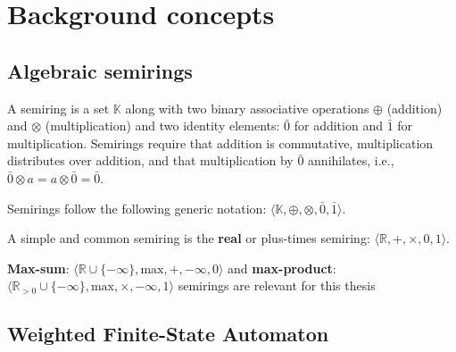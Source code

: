 \chapter{Background concepts}

\label{background}

\section{Algebraic semirings}

\begin{definition}
  A semiring is a set $\mathbb{K}$ along with two binary associative operations $\oplus$ (addition) and $\otimes$ (multiplication) and two identity elements: $\bar{0}$ for addition and $\bar{1}$ for multiplication. Semirings require that addition is commutative, multiplication distributes over addition, and that multiplication by $\bar{0}$ annihilates, i.e., $\bar{0} \otimes a = a \otimes \bar{0} = \bar{0}$. \\
\end{definition}

\vspace{-10pt}

\begin{remark}
  Semirings follow the following generic notation: $\langle \mathbb{K}, \oplus, \otimes, \bar{0}, \bar{1} \rangle$.
\end{remark}

\begin{remark}
  A simple and common semiring is the \textbf{real} or plus-times semiring: $\langle \mathbb{R}, +, \times, 0, 1 \rangle$.
\end{remark}

\begin{remark}
  \textbf{Max-sum}: $\langle \mathbb{R} \cup \{-\infty\}, \text{max}, +, -\infty, 0 \rangle$ and \textbf{max-product}: $\langle \mathbb{R}_{>0} \cup \{-\infty\}, \text{max}, \times, -\infty, 1 \rangle$ semirings are relevant for this thesis
\end{remark}

\section{Weighted Finite-State Automaton}



